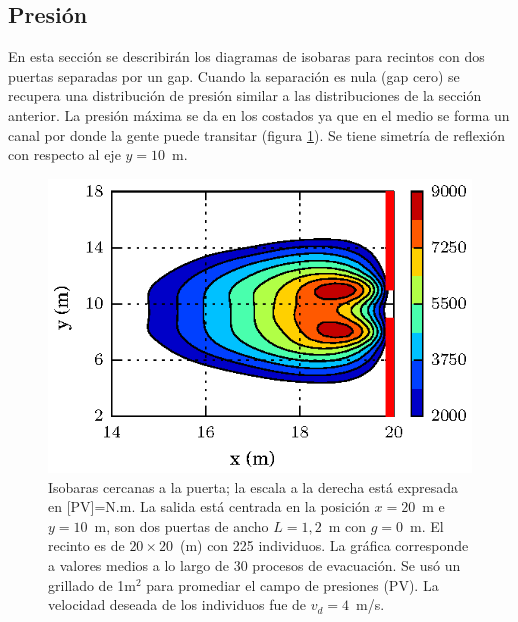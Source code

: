 


\subsection{Presión}

En esta sección se describirán los diagramas de isobaras para recintos con dos puertas separadas por un gap. 
Cuando la separación es nula (gap cero) se recupera una distribución de presión similar a las distribuciones de la sección anterior. La presión máxima se da en los costados ya que en el medio se forma un canal por donde la gente puede transitar (figura \ref{presion_225p_g0}). Se tiene simetría de reflexión con respecto al eje $y=10$~m. 
\begin{figure}[H]
    \centering
    \includegraphics[scale=1]{figuras/press_225p_v4_g0.eps}
    \caption[width=5cm]{Isobaras cercanas a la puerta; la escala a la derecha está expresada en [PV]=N.m. La salida está centrada en la posición $x=20$~m e $y=10$~m, son dos puertas de ancho $L=1,2$~m con $g=0$~m. El recinto es de $20\times 20$~(m) con 225 individuos. La gráfica corresponde a valores medios a lo largo de 30 procesos de evacuación. Se usó un grillado de 1m$^2$ para promediar el campo de presiones (PV). La velocidad deseada de los individuos fue de $v_d=4$~m/s.}
    \label{presion_225p_g0}
\end{figure}

